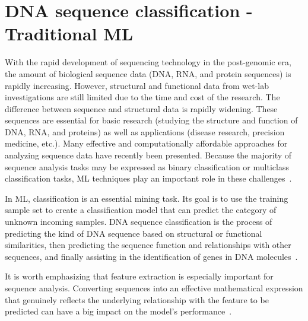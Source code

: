 \section{DNA sequence classification - Traditional ML}

With the rapid development of sequencing technology in the post-genomic era, the amount of biological sequence data (\gls{DNA}, \gls{RNA}, and protein sequences) is rapidly increasing. However, structural and functional data from wet-lab investigations are still limited due to the time and cost of the research. The difference between sequence and structural data is rapidly widening. These sequences are essential for basic research (studying the structure and function of \gls{DNA}, \gls{RNA}, and proteins) as well as applications (disease research, precision medicine, etc.). Many effective and computationally affordable approaches for analyzing sequence data have recently been presented. Because the majority of sequence analysis tasks may be expressed as binary classification or multiclass classification tasks, \gls{ML} techniques play an important role in these challenges~\cite{Liu2019BioSeq-Analysis:Approaches}.

In \gls{ML}, classification is an essential mining task. Its goal is to use the training sample set to create a classification model that can predict the category of unknown incoming samples. \gls{DNA} sequence classification is the process of predicting the kind of \gls{DNA} sequence based on structural or functional similarities, then predicting the sequence function and relationships with other sequences, and finally assisting in the identification of genes in \gls{DNA} molecules~\cite{Yang2020ReviewDNA}.

It is worth emphasizing that feature extraction is especially important for sequence analysis. Converting sequences into an effective mathematical expression that genuinely reflects the underlying relationship with the feature to be predicted can have a big impact on the model's performance~\cite{Chen2020ILearn:Data}.

